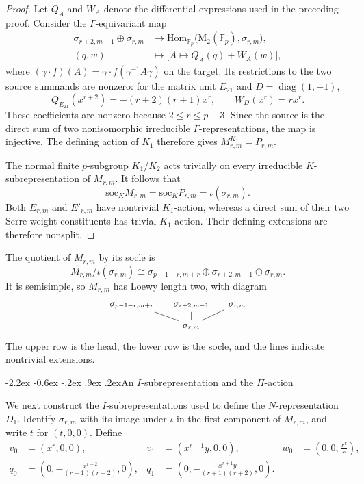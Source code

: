 \documentclass[10pt]{article}
\makeatletter
\renewcommand\subsection{\@startsection{subsection}{2}{\z@}%
  {-2.2ex \@plus -0.6ex \@minus -.2ex}%
  {.9ex \@plus .2ex}{\normalfont\large\bfseries}}
\theoremstyle{plain}
\theoremstyle{definition}
\theoremstyle{remark}
\newcommand{\Fp}{\mathbb{F}_p}
\newcommand{\Mat}{\mathrm{M}}
\newcommand{\Hom}{\mathrm{Hom}}
\newcommand{\soc}{\mathrm{soc}}
\makeatother
\begin{document}
\begin{proof}
Let $Q_A$ and $W_A$ denote the differential expressions used in the preceding proof. Consider the $\Gamma$-equivariant map
\[
\begin{aligned}
\sigma_{r+2,m-1}\oplus\sigma_{r,m}
&\longrightarrow\Hom_{\Fp}\bigl(\Mat_2(\Fp),\sigma_{r,m}\bigr),\\
(q,w)&\longmapsto\bigl[A\longmapsto Q_A(q)+W_A(w)\bigr],
\end{aligned}
\]
where $(\gamma\cdot f)(A)=\gamma\cdot f(\gamma^{-1}A\gamma)$ on the target. Its restrictions to the two source summands are nonzero: for the matrix unit $E_{21}$ and $D=\operatorname{diag}(1,-1)$,
\[
Q_{E_{21}}(x^{r+2})=-(r+2)(r+1)x^r,\qquad
W_D(x^r)=r x^r.
\]
These coefficients are nonzero because $2\leq r\leq p-3$. Since the source is the direct sum of two nonisomorphic irreducible $\Gamma$-representations, the map is injective. The defining action of $K_1$ therefore gives $M_{r,m}^{K_1}=P_{r,m}$.

The normal finite $p$-subgroup $K_1/K_2$ acts trivially on every irreducible $K$-subrepresentation of $M_{r,m}$. It follows that
\[
\soc_K M_{r,m}=\soc_K P_{r,m}=\iota(\sigma_{r,m}).
\]
Both $E_{r,m}$ and $E'_{r,m}$ have nontrivial $K_1$-action, whereas a direct sum of their two Serre-weight constituents has trivial $K_1$-action. Their defining extensions are therefore nonsplit.
\end{proof}

The quotient of $M_{r,m}$ by its socle is
\[
M_{r,m}/\iota(\sigma_{r,m})\cong
\sigma_{p-1-r,m+r}\oplus\sigma_{r+2,m-1}\oplus\sigma_{r,m}.
\]
It is semisimple, so $M_{r,m}$ has Loewy length two, with diagram
\[
\begin{tikzcd}[row sep=small, column sep=small, cells={nodes={font=\small}}]
\sigma_{p-1-r,m+r} \arrow[dr, no head] & \sigma_{r+2,m-1} \arrow[d, no head] & \sigma_{r,m} \arrow[dl, no head] \\
& \sigma_{r,m} &
\end{tikzcd}
\]
The upper row is the head, the lower row is the socle, and the lines indicate nontrivial extensions.

\subsection{An \texorpdfstring{$I$}{I}-subrepresentation and the \texorpdfstring{$\Pi$}{Pi}-action}

We next construct the $I$-subrepresentations used to define the $N$-representation $D_1$. Identify $\sigma_{r,m}$ with its image under $\iota$ in the first component of $M_{r,m}$, and write $t$ for $(t,0,0)$. Define
\begin{equation}\label{eq:D0-vectors}
\begin{aligned}
v_0&=(x^r,0,0),&
v_1&=(x^{r-1}y,0,0),&
w_0&=\left(0,0,\frac{x^r}{r}\right),\\
q_0&=\left(0,-\frac{x^{r+2}}{(r+1)(r+2)},0\right),&
q_1&=\left(0,-\frac{x^{r+1}y}{(r+1)(r+2)},0\right).
\end{aligned}
\end{equation}
\end{document}

